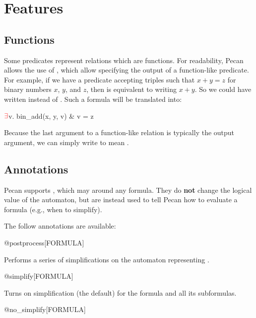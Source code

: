 \section{Features}\label{sec:features}

\subsection{Functions}

Some predicates represent relations which are functions.
For readability, Pecan allows the use of , which allow specifying the output of a function-like predicate.
For example, if we have a predicate  accepting triples such that $x + y = z$ for binary numbers $x$, $y$, and $z$, then  is equivalent to writing $x + y$.
So we could have written  instead of .
Such a formula will be translated into:
\begin{pecan}
$\color{red} \exists$v. bin_add(x, y, v) & v = z
\end{pecan}

Because the last argument to a function-like relation is typically the output argument, we can simply write  to mean .

\subsection{Annotations}

Pecan supports , which may  around any formula.
They do \textbf{not} change the logical value of the automaton, but are instead used to tell Pecan how to evaluate a formula (e.g., when to simplify).

The follow annotations are available:

\begin{pecan}
@postprocess[FORMULA]
\end{pecan}

Performs a series of simplifications on the automaton representing .

\begin{pecan}
@simplify[FORMULA]
\end{pecan}

Turns on simplification (the default) for the formula and all its subformulas.

\begin{pecan}
@no_simplify[FORMULA]
\end{pecan}

